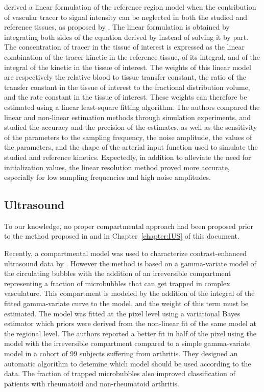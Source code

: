 \citet{CardenasRodriguez:2013em} derived a linear formulation of the reference region model when the contribution of vascular tracer to signal intensity can be neglected in both the studied and reference tissues, as proposed by \citet{Yankeelov:2005dea}.
The linear formulation is obtained by integrating both sides of the equation derived by \citet{Yankeelov:2005dea} instead of solving it by part. 
The concentration of tracer in the tissue of interest is expressed as the linear combination of the tracer kinetic in the reference tissue, of its integral, and of the integral of the kinetic in the tissue of interest.
The weights of this linear model are respectively the relative blood to tissue transfer constant, the ratio of the transfer constant in the tissue of interest to the fractional distribution volume, and the rate constant in the tissue of interest.
These weights can therefore be estimated using a linear least-square fitting algorithm.
The authors compared the linear and non-linear estimation methods through simulation experiments, and studied the accuracy and the precision of the estimates, as well as the sensitivity of the parameters to the sampling frequency, the noise amplitude, the values of the parameters, and the shape of the arterial input function used to simulate the studied and reference kinetics.
Expectedly, in addition to alleviate the need for initialization values, the linear resolution method proved more accurate, especially for low sampling frequencies and high noise amplitudes.

\subsection{Ultrasound}
To our knowledge, no proper compartmental approach had been proposed prior to the method proposed in \cite{Doury:2016fi} and in Chapter~\ref{chapter:IUS} of this document.

Recently, a compartmental model was used to characterize contrast-enhanced ultrasound data by \citet{Rizzo:2016dz}.
However the method is based on a gamma-variate model of the circulating bubbles with the addition of an irreversible compartment representing a fraction of microbubbles that can get trapped in complex vasculature.
This compartment is modeled by the addition of the integral of the fitted gamma-variate curve to the model, and the weight of this term must be estimated.
The model was fitted at the pixel level using a variational Bayes estimator which priors were derived from the non-linear fit of the same model at the regional level.
The authors reported a better fit in half of the pixel using the model with the irreversible compartment compared to a simple gamma-variate model in a cohort of 99 subjects suffering from arthritis.
They designed an automatic algorithm to detemine which model should be used according to the data.
The fraction of trapped microbubbles also improved classification of patients with rheumatoid and non-rheumatoid arthritis.


